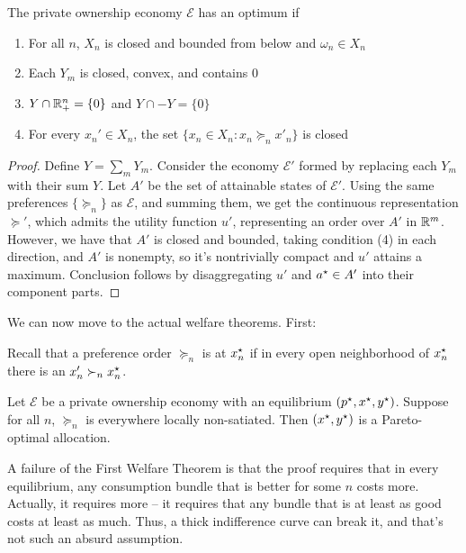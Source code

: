 \documentclass[10pt]{article}
\begin{document}
\begin{theorem}
	The private ownership economy $\mathcal{E}$ has an optimum if
	\begin{enumerate}
		\item For all $n$, $X_n$ is closed and bounded from below and $\omega_n \in X_n$
		\item Each $Y_m$ is closed, convex, and contains 0
		\item $Y \cap \mathbb{R}^n_+ = \{0\}$ and $Y \cap -Y = \{0\}$
		\item For every $x_n' \in X_n$, the set $\{x_n \in X_n : x_n \succeq_n x'_n\}$ is closed
	\end{enumerate}
\end{theorem}
\begin{proof}
	Define $Y = \sum_m Y_m$. Consider the economy $\mathcal{E}'$ formed by replacing each $Y_m$ with their sum $Y$. Let $A'$ be the set of attainable states of $\mathcal{E}'$. Using the same preferences $\{\succeq_n\}$ as $\mathcal{E}$, and summing them, we get the continuous representation $\succeq'$, which admits the utility function $u'$, representing an order over $A'$ in $\mathbb{R}^m$. However, we have that $A'$ is closed and bounded, taking condition (4) in each direction, and $A'$ is nonempty, so it's nontrivially compact and $u'$ attains a maximum. Conclusion follows by disaggregating $u'$ and $a^\star \in A'$ into their component parts.
\end{proof}

We can now move to the actual welfare theorems. First:

\begin{definition}
	Recall that a preference order $\succeq_n$ is  at $x_n^\star$ if in every open neighborhood of $x_n^\star$ there is an $x_n' \succ_n x_n^\star$.
\end{definition}


\begin{theorem}\label{thm:first_welfare_theorem}
	 Let $\mathcal{E}$ be a private ownership economy with an equilibrium $(p^\star,x^\star,y^\star)$. Suppose for all $n$, $\succeq_n$ is everywhere locally non-satiated. Then $(x^\star,y^\star)$ is a Pareto-optimal allocation.
\end{theorem}
\begin{remark}
	A failure of the First Welfare Theorem is that the proof requires that in every equilibrium, any consumption bundle that is better for some $n$ costs more. Actually, it requires more -- it requires that any bundle that is at least as good costs at least as much. Thus, a thick indifference curve can break it, and that's not such an absurd assumption.
\end{remark}
\end{document}
